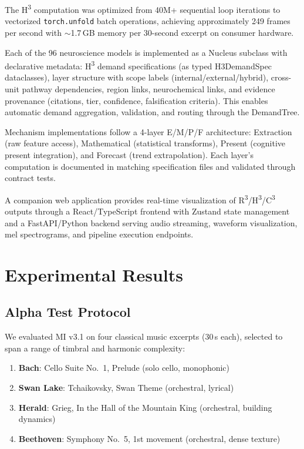 \documentclass[10pt,twocolumn]{article}
\newcommand{\Rcube}{R\textsuperscript{3}}
\newcommand{\Hcube}{H\textsuperscript{3}}
\newcommand{\Ccube}{C\textsuperscript{3}}
\begin{document}
The \Hcube{} computation was optimized from 40M+ sequential loop iterations to vectorized \texttt{torch.unfold} batch operations, achieving approximately 249 frames per second with $\sim$1.7\,GB memory per 30-second excerpt on consumer hardware.

Each of the 96 neuroscience models is implemented as a Nucleus subclass with declarative metadata: \Hcube{} demand specifications (as typed H3DemandSpec dataclasses), layer structure with scope labels (internal/external/hybrid), cross-unit pathway dependencies, region links, neurochemical links, and evidence provenance (citations, tier, confidence, falsification criteria).
This enables automatic demand aggregation, validation, and routing through the DemandTree.

Mechanism implementations follow a 4-layer E/M/P/F architecture: Extraction (raw feature access), Mathematical (statistical transforms), Present (cognitive present integration), and Forecast (trend extrapolation).
Each layer's computation is documented in matching specification files and validated through contract tests.

A companion web application provides real-time visualization of \Rcube{}/\Hcube{}/\Ccube{} outputs through a React/TypeScript frontend with Zustand state management and a FastAPI/Python backend serving audio streaming, waveform visualization, mel spectrograms, and pipeline execution endpoints.

\section{Experimental Results}
\label{sec:results}

\subsection{Alpha Test Protocol}

We evaluated MI v3.1 on four classical music excerpts (30\,s each), selected to span a range of timbral and harmonic complexity:

\begin{enumerate}[leftmargin=*,nosep]
    \item \textbf{Bach}: Cello Suite No.~1, Prelude (solo cello, monophonic)
    \item \textbf{Swan Lake}: Tchaikovsky, Swan Theme (orchestral, lyrical)
    \item \textbf{Herald}: Grieg, In the Hall of the Mountain King (orchestral, building dynamics)
    \item \textbf{Beethoven}: Symphony No.~5, 1st movement (orchestral, dense texture)
\end{enumerate}
\end{document}
